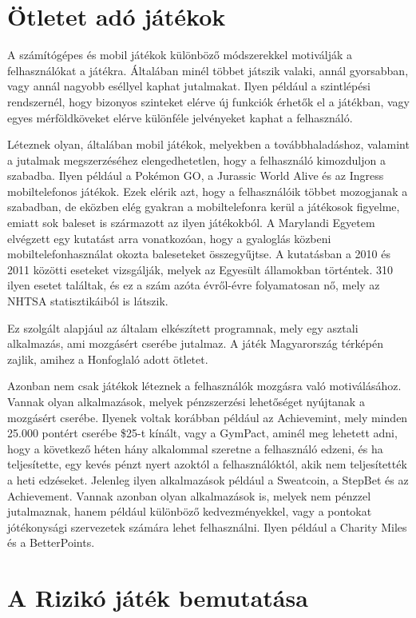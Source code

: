 \section{Ötletet adó játékok}


A számítógépes és mobil játékok különböző módszerekkel motiválják a felhasználókat a játékra. Általában minél többet játszik valaki, annál gyorsabban, vagy annál nagyobb eséllyel kaphat jutalmakat. Ilyen például a szintlépési rendszernél, hogy bizonyos szinteket elérve új funkciók érhetők el a játékban, vagy egyes mérföldköveket elérve különféle jelvényeket kaphat a felhasználó. 

Léteznek olyan, általában mobil játékok, melyekben a továbbhaladáshoz, valamint a jutalmak megszerzéséhez elengedhetetlen, hogy a felhasználó kimozduljon a szabadba. Ilyen például a Pokémon GO, a Jurassic World Alive és az Ingress mobiltelefonos játékok. Ezek elérik azt, hogy a felhasználóik többet mozogjanak a szabadban, de eközben elég gyakran a mobiltelefonra kerül a játékosok figyelme, emiatt sok baleset is származott az ilyen játékokból. A Marylandi Egyetem elvégzett egy kutatást arra vonatkozóan, hogy a gyaloglás közbeni mobiltelefonhasználat okozta baleseteket összegyűjtse. A kutatásban a 2010 és 2011 közötti eseteket vizsgálják, melyek az Egyesült államokban történtek. 310 ilyen esetet találtak, és ez a szám azóta évről-évre folyamatosan nő, mely az NHTSA statisztikáiból is látszik. 

Ez szolgált alapjául az általam elkészített programnak, mely egy asztali alkalmazás, ami mozgásért cserébe jutalmaz. A játék Magyarország térképén zajlik, amihez a Honfoglaló adott ötletet. 

Azonban nem csak játékok léteznek a felhasználók mozgásra való motiválásához. Vannak olyan alkalmazások, melyek pénzszerzési lehetőséget nyújtanak a mozgásért cserébe. Ilyenek voltak korábban például az Achievemint, mely minden 25.000 pontért cserébe \$25-t kínált, vagy a GymPact, aminél meg lehetett adni, hogy a következő héten hány alkalommal szeretne a felhasználó edzeni, és ha teljesítette, egy kevés pénzt nyert azoktól a felhasználóktól, akik nem teljesítették a heti edzéseket. Jelenleg ilyen alkalmazások például a Sweatcoin, a StepBet és az Achievement. Vannak azonban olyan alkalmazások is, melyek nem pénzzel jutalmaznak, hanem például különböző kedvezményekkel, vagy a pontokat jótékonysági szervezetek számára lehet felhasználni. Ilyen például a Charity Miles és a BetterPoints. 

\section{A Rizikó játék bemutatása}

